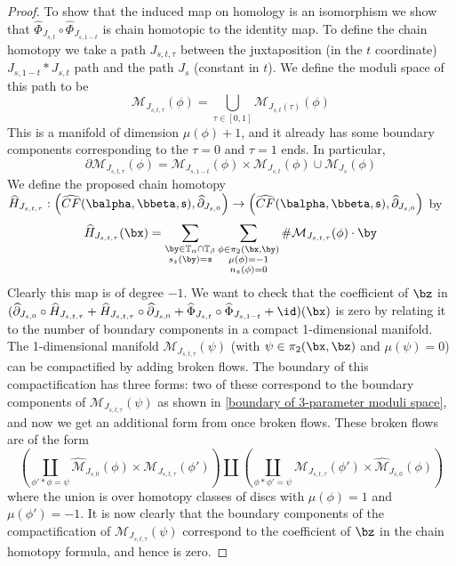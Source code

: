 \begin{proof}
To show that the induced map on homology is an isomorphism we show that $\widehat{\Phi}_{J_{s,t}} \circ \widehat{\Phi}_{J_{s,1-t}}$ is chain homotopic to the identity map. To define the chain homotopy we take a path $J_{s,t,\tau}$ between the juxtaposition (in the $t$ coordinate) $J_{s,1-t} * J_{s,t}$ path and the path $J_s$ (constant in $t$). We define the moduli space of this path to be
\[ \mathcal M_{J_{s,t,\tau}}(\phi) = \bigcup_{\tau \in [0,1]} \mathcal M_{J_{s,t}(\tau)}(\phi) \]
This is a manifold of dimension $\mu(\phi)+1$, and it already has some boundary components corresponding to the $\tau=0$ and $\tau=1$ ends. In particular, 
\begin{equation}
\label{boundary of 3-parameter moduli space}
\partial \mathcal M_{J_{s,t,\tau}}(\phi) = \mathcal M_{J_{s,1-t}}(\phi) \times \mathcal M_{J_{s,t}}(\phi) \cup \mathcal M_{J_s}(\phi)
\end{equation}
We define the proposed chain homotopy $\widehat{H}_{J_{s,t,\tau}} : \left( \widehat{CF}(\balpha,\bbeta,\mathfrak s),\widehat{\partial}_{J_{s,0}} \right) \rightarrow \left( \widehat{CF}(\balpha,\bbeta,\mathfrak s), \widehat{\partial}_{J_{s,0}} \right)$ by
\[ \widehat{H}_{J_{s,t,\tau}}(\bx) = \sum_{\substack{\by \in \mathbb T_\alpha \cap \mathbb T_\beta \\ s_z(\by)=\mathfrak s}} \sum_{\substack{\phi \in \pi_2(\bx,\by) \\ \mu(\phi)=-1 \\ n_z(\phi)=0}} \# \mathcal M_{J_{s,t,\tau}}(\phi) \cdot \by \]
Clearly this map is of degree $-1$. We want to check that the coefficient of $\bz$ in $(\widehat{\partial}_{J_{s,0}} \circ \widehat{H}_{J_{s,t,\tau}} + \widehat{H}_{J_{s,t,\tau}} \circ \widehat{\partial}_{J_{s,0}} + \widehat{\Phi}_{J_{s,t}} \circ \widehat{\Phi}_{J_{s,1-t}} + \id)(\bx)$ is zero by relating it to the number of boundary components in a compact 1-dimensional manifold. The 1-dimensional manifold $\mathcal M_{J_{s,t,\tau}}(\psi)$ (with $\psi \in \pi_2(\bx,\bz)$ and $\mu(\psi)=0$) can be compactified by adding broken flows. The boundary of this compactification has three forms: two of these correspond to the boundary components of $\mathcal M_{J_{s,t,\tau}}(\psi)$ as shown in \eqref{boundary of 3-parameter moduli space}, and now we get an additional form from once broken flows. These broken flows are of the form
\[ \left( \coprod_{\phi' * \phi = \psi} \widehat{\mathcal M}_{J_{s,0}}(\phi) \times \mathcal M_{J_{s,t,\tau}}(\phi') \right) \coprod \left( \coprod_{\phi * \phi' = \psi} \mathcal M_{J_{s,t,\tau}}(\phi') \times \widehat{\mathcal M}_{J_{s,0}}(\phi) \right) \]
where the union is over homotopy classes of discs with $\mu(\phi)=1$ and $\mu(\phi')=-1$. It is now clearly that the boundary components of the compactification of $\mathcal M_{J_{s,t,\tau}}(\psi)$ correspond to the coefficient of $\bz$ in the chain homotopy formula, and hence is zero.
\end{proof}






